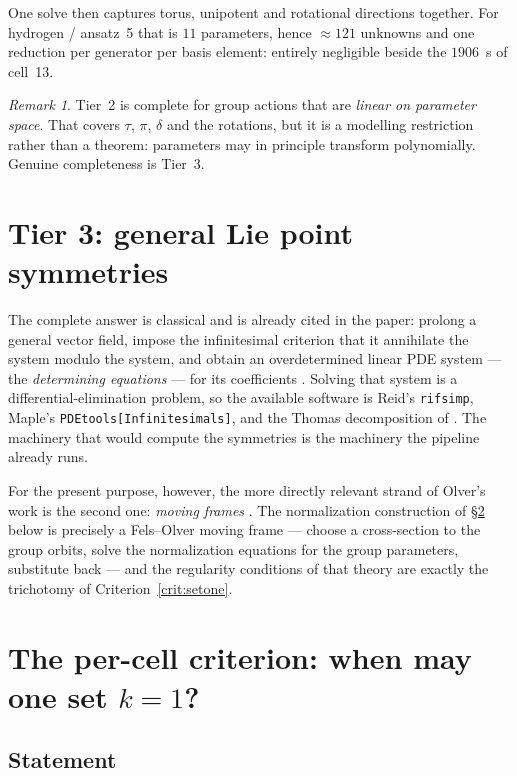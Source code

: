 \documentclass[11pt]{article}
\newcommand{\code}[1]{\texttt{#1}}
\theoremstyle{plain}
\theoremstyle{definition}
\theoremstyle{remark}
\newtheorem{remark}[proposition]{Remark}
\begin{document}
One solve then captures torus, unipotent and rotational directions together.
For hydrogen / ansatz~5 that is $11$ parameters, hence $\approx 121$ unknowns
and one reduction per generator per basis element: entirely negligible beside
the $1906$~s of cell~13.

\begin{remark}
Tier~2 is complete for group actions that are \emph{linear on parameter space}.
That covers $\tau$, $\pi$, $\delta$ and the rotations, but it is a modelling
restriction rather than a theorem: parameters may in principle transform
polynomially. Genuine completeness is Tier~3.
\end{remark}

\section{Tier 3: general Lie point symmetries}
\label{sec:tier3}

The complete answer is classical and is already cited in the paper: prolong a
general vector field, impose the infinitesimal criterion that it annihilate the
system modulo the system, and obtain an overdetermined linear PDE system --- the
\emph{determining equations} --- for its coefficients \cite{Olver}. Solving
that system is a differential-elimination problem, so the available software is
Reid's \code{rifsimp}, Maple's \code{PDEtools[Infinitesimals]}, and the Thomas
decomposition of \cite{ThomasDecomp}. The machinery that would compute the
symmetries is the machinery the pipeline already runs.

For the present purpose, however, the more directly relevant strand of Olver's
work is the second one: \emph{moving frames}
\cite{OlverEquivalence,FelsOlverI,FelsOlverII}. The normalization construction
of \S\ref{sec:criterion} below is precisely a Fels--Olver moving frame ---
choose a cross-section to the group orbits, solve the normalization equations
for the group parameters, substitute back --- and the regularity conditions of
that theory are exactly the trichotomy of Criterion~\ref{crit:setone}.

\section{The per-cell criterion: when may one set $k = 1$?}
\label{sec:criterion}

\subsection{Statement}
\end{document}
